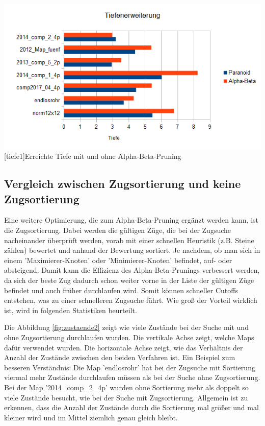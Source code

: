 \documentclass[12pt,a4paper,bibliography=totocnumbered,listof=totocnumbered]{scrartcl}
\begin{document}
	 \vspace{1em}
	 \begin{minipage}{\linewidth}
	 	\centering
	 	\includegraphics[width=1\linewidth]{pics/Kapitel_4/TiefeParaAlpha.png}
	 	[tiefe1]{Erreichte Tiefe mit und ohne Alpha-Beta-Pruning}
	 	\label{fig:tiefe1}
	 \end{minipage}
	 \vspace{1em}

    \subsection{Vergleich zwischen Zugsortierung und keine Zugsortierung}
    \vspace{1em}
    
    Eine weitere Optimierung, die zum Alpha-Beta-Pruning ergänzt werden kann, ist die Zugsortierung. Dabei werden die gültigen Züge, die bei der Zugsuche nacheinander überprüft werden, vorab mit einer schnellen Heuristik (z.B. Steine zählen) bewertet und anhand der Bewertung sortiert. Je nachdem, ob man sich in einem 'Maximierer-Knoten' oder 'Minimierer-Knoten' befindet, auf- oder absteigend. Damit kann die Effizienz des Alpha-Beta-Prunings verbessert werden, da sich der beste Zug dadurch schon weiter vorne in der Liste der gültigen Züge befindet und auch früher durchlaufen wird. Somit können schneller Cutoffs entstehen, was zu einer schnelleren Zugsuche führt. Wie groß der Vorteil wirklich ist, wird in folgenden Statistiken beurteilt.
    
    Die Abbildung \ref{fig:zustaende2} zeigt wie viele Zustände bei der Suche mit und ohne Zugsortierung durchlaufen wurden. Die vertikale Achse zeigt, welche Maps dafür verwendet wurden. Die horizontale Achse zeigt, wie das Verhältnis der Anzahl der Zustände zwischen den beiden Verfahren ist. Ein Beispiel zum besseren Verständnis:\newline
    Die Map 'endlosrohr' hat bei der Zugsuche mit Sortierung viermal mehr Zustände durchlaufen müssen als bei der Suche ohne Zugsortierung.\newline
    Bei der Map '2014\_comp\_2\_4p' wurden ohne Sortierung mehr als doppelt so viele Zustände besucht, wie bei der Suche mit Zugsortierung.\newline
    Allgemein ist zu erkennen, dass die Anzahl der Zustände durch die Sortierung mal größer und mal kleiner wird und im Mittel ziemlich genau gleich bleibt.
    
\end{document}
